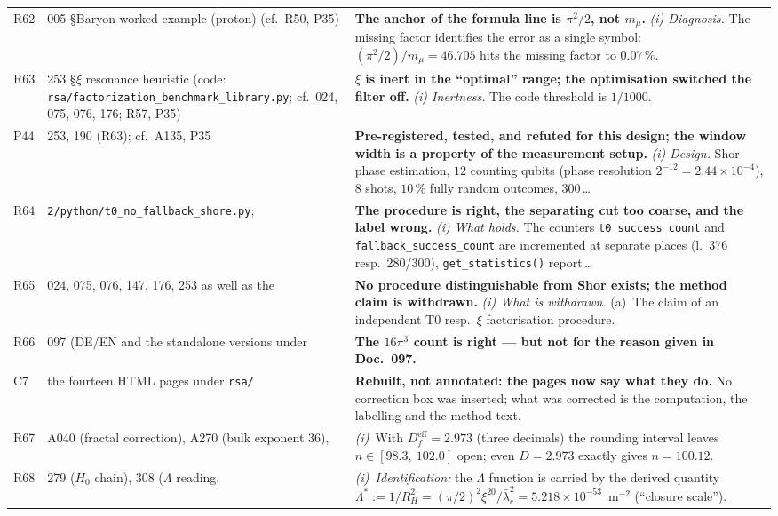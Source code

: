 \begin{longtable}{@{}p{0.9cm}p{3.1cm}p{10.2cm}@{}}
R62 & 005 \S{}Baryon worked example (proton) (cf.\ R50, P35) & \textbf{The anchor of the formula line is $\pi^2/2$, not $m_\mu$.} \emph{(i) Diagnosis.} The missing factor identifies the error as a single symbol: $(\pi^2/2)/m_\mu = 46.705$ hits the missing factor to $0.07\,\%$. \\
R63 & 253 \S{}$\xi$ resonance heuristic (code: \texttt{rsa/\allowbreak factorization\_\allowbreak benchmark\_\allowbreak library.py}; cf.\ 024, 075, 076, 176; R57, P35) & \textbf{$\xi$ is inert in the \enquote{optimal} range; the optimisation switched the filter off.} \emph{(i) Inertness.} The code threshold is $1/1000$. \\
P44 & 253, 190 (R63); cf.\ A135, P35 & \textbf{Pre-registered, tested, and refuted for this design; the window width is a property of the measurement setup.} \emph{(i) Design.} Shor phase estimation, $12$ counting qubits (phase resolution $2^{-12} = 2.44\times10^{-4}$), $8$ shots, $10\,\%$ fully random outcomes, $300$\,\ldots \\
R64 & \texttt{2/python/t0\_no\_fallback\_shore.py}; & \textbf{The procedure is right, the separating cut too coarse, and the label wrong.} \emph{(i) What holds.} The counters \texttt{t0\_success\_count} and \texttt{fallback\_success\_count} are incremented at separate places (l.~376 resp.\ 280/300), \texttt{get\_statistics()} report\,\ldots \\
R65 & 024, 075, 076, 147, 176, 253 as well as the & \textbf{No procedure distinguishable from Shor exists; the method claim is withdrawn.} \emph{(i) What is withdrawn.} (a)~The claim of an independent T0 resp.\ $\xi$ factorisation procedure. \\
R66 & 097 (DE/EN and the standalone versions under & \textbf{The $16\pi^3$ count is right --- but not for the reason given in Doc.~097.} \\
C7 & the fourteen HTML pages under \texttt{rsa/} & \textbf{Rebuilt, not annotated: the pages now say what they do.} No correction box was inserted; what was corrected is the computation, the labelling and the method text. \\
R67 & A040 (fractal correction), A270 (bulk exponent 36), & \emph{(i)}~With $D_f^\text{eff} = 2.973$ (three decimals) the rounding interval leaves $n \in [98.3,\ 102.0]$ open; even $D = 2.973$ exactly gives $n = 100.12$. \\
R68 & 279 ($H_0$ chain), 308 ($\Lambda$ reading, & \emph{(i)~Identification:} the $\Lambda$ function is carried by the derived quantity $\Lambda^{*} := 1/R_H^2 = (\pi/2)^2\xi^{20}/ \bar\lambda_e^2 = 5.218\times10^{-53}$~m$^{-2}$ (\enquote{closure scale}). \\

\end{longtable}
